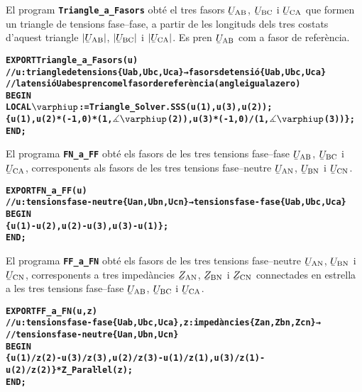 El program \texttt{\textbf{Triangle\_a\_Fasors}} obté el tres fasors $\cmplx{U}\ped{AB}$, $\cmplx{U}\ped{BC}$ i $\cmplx{U}\ped{CA}$ que formen un triangle de tensions fase--fase, a partir de les longituds dels tres costats d'aquest triangle $|\cmplx{U}\ped{AB}|$, $|\cmplx{U}\ped{BC}|$ i $|\cmplx{U}\ped{CA}|$. Es pren $\cmplx{U}\ped{AB}$ com a fasor de referència.
\vspace{-6mm}
\begin{alltt}
\bfseries
{}
    EXPORT Triangle_a_Fasors(u)
    // u:triangle de tensions \{Uab,Ubc,Uca\} → fasors de tensió \{Uab,Ubc,Uca\}
    // la tensió Uab es pren com el fasor de referència (angle igual a zero)
    BEGIN
      LOCAL \(\varphiup\):=Triangle_Solver.SSS(u(1),u(3),u(2));
      \{u(1),u(2)*(-1,0)*(1,\(\measuredangle\varphiup\)(2)),u(3)*(-1,0)/(1,\(\measuredangle\varphiup\)(3))\};
    END;
\end{alltt}

El programa \texttt{\textbf{FN\_a\_FF}} obté els fasors de les tres tensions fase--fase $\cmplx{U}\ped{AB}$, $\cmplx{U}\ped{BC}$ i $\cmplx{U}\ped{CA}$, corresponents als fasors de les tres tensions fase--neutre
$\cmplx{U}\ped{AN}$, $\cmplx{U}\ped{BN}$ i $\cmplx{U}\ped{CN}$.
\vspace{-6mm}
\begin{alltt}
\bfseries
{}
    EXPORT FN_a_FF(u)
    // u:tensions fase-neutre \{Uan,Ubn,Ucn\} → tensions fase-fase \{Uab,Ubc,Uca\}
    BEGIN
      \{u(1)-u(2),u(2)-u(3),u(3)-u(1)\};
    END;
\end{alltt}

El programa \texttt{\textbf{FF\_a\_FN}} obté els fasors de les tres tensions fase--neutre $\cmplx{U}\ped{AN}$, $\cmplx{U}\ped{BN}$ i $\cmplx{U}\ped{CN}$, corresponents a tres impedàncies $\cmplx{Z}\ped{AN}$, $\cmplx{Z}\ped{BN}$ i $\cmplx{Z}\ped{CN}$ connectades en estrella a  les tres tensions fase--fase
$\cmplx{U}\ped{AB}$, $\cmplx{U}\ped{BC}$ i $\cmplx{U}\ped{CA}$.
\vspace{-6mm}
\begin{alltt}
\bfseries
{}
    EXPORT FF_a_FN(u,z)
    // u:tensions fase-fase \{Uab,Ubc,Uca\}, z:impedàncies \{Zan,Zbn,Zcn\} →
    // tensions fase-neutre \{Uan,Ubn,Ucn\}
    BEGIN
      \{u(1)/z(2)-u(3)/z(3),u(2)/z(3)-u(1)/z(1),u(3)/z(1)-u(2)/z(2)\}*Z_Paraŀlel(z);
    END;
\end{alltt}

